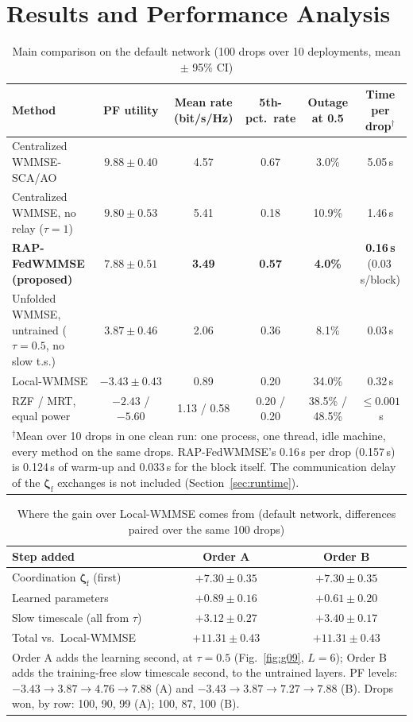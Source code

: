 \documentclass[conference]{IEEEtran}
\newcommand{\zf}{\boldsymbol{\zeta}_{\mathrm{f}}}
\begin{document}
\section{Results and Performance Analysis}

\begin{table}[t]
\caption{Main comparison on the default network (100 drops over 10
deployments, mean $\pm$ 95\% CI)}
\label{tab:main}
\centering
\begin{tabular}{lccccc}
\toprule
Method & PF utility & Mean rate (bit/s/Hz) & 5th-pct.\ rate &
Outage at 0.5 & Time per drop$^{\dagger}$ \\
\midrule
Centralized WMMSE-SCA/AO & $9.88 \pm 0.40$ & 4.57 & 0.67 & 3.0\% &
5.05\,s \\
Centralized WMMSE, no relay ($\tau{=}1$) & $9.80 \pm 0.53$ & 5.41 & 0.18 &
10.9\% & 1.46\,s \\
\textbf{RAP-FedWMMSE (proposed)} & $\mathbf{7.88 \pm 0.51}$ &
\textbf{3.49} & \textbf{0.57} & \textbf{4.0\%} &
\textbf{0.16\,s} (0.03\,s/block) \\
Unfolded WMMSE, untrained ($\tau{=}0.5$, no slow t.s.) &
$3.87 \pm 0.46$ & 2.06 & 0.36 & 8.1\% & 0.03\,s \\
Local-WMMSE & $-3.43 \pm 0.43$ & 0.89 & 0.20 & 34.0\% & 0.32\,s \\
RZF / MRT, equal power & $-2.43$ / $-5.60$ & 1.13 / 0.58 & 0.20 / 0.20 &
38.5\% / 48.5\% & $\le 0.001$\,s \\
\bottomrule
\multicolumn{6}{p{0.92\textwidth}}{\footnotesize $^{\dagger}$Mean over 10
drops in one clean run: one process, one thread, idle machine, every method
on the same drops. RAP-FedWMMSE's 0.16\,s per drop (0.157\,s) is 0.124\,s of
warm-up and 0.033\,s for the block itself. The communication delay of the $\zf$ exchanges
is not included (Section~\ref{sec:runtime}).}
\end{tabular}
\end{table}

\begin{table}[t]
\caption{Where the gain over Local-WMMSE comes from (default network,
differences paired over the same 100 drops)}
\label{tab:decomp}
\centering
\footnotesize
\setlength{\tabcolsep}{3pt}
\begin{tabular}{lcc}
\toprule
Step added & Order A & Order B \\
\midrule
Coordination $\zf$ (first) & $+7.30\pm0.35$ & $+7.30\pm0.35$ \\
Learned parameters & $+0.89\pm0.16$ & $+0.61\pm0.20$ \\
Slow timescale (all from $\tau$) & $+3.12\pm0.27$ & $+3.40\pm0.17$ \\
\midrule
Total vs.\ Local-WMMSE & $+11.31\pm0.43$ & $+11.31\pm0.43$ \\
\bottomrule
\multicolumn{3}{p{0.9\columnwidth}}{\footnotesize Order A adds the learning
second, at $\tau=0.5$ (Fig.~\ref{fig:g09}, $L=6$); Order B adds the
training-free slow timescale second, to the untrained layers. PF levels:
$-3.43\to3.87\to4.76\to7.88$ (A) and $-3.43\to3.87\to7.27\to7.88$ (B). Drops
won, by row: 100, 90, 99 (A); 100, 87, 100 (B).}
\end{tabular}
\end{table}
\end{document}
